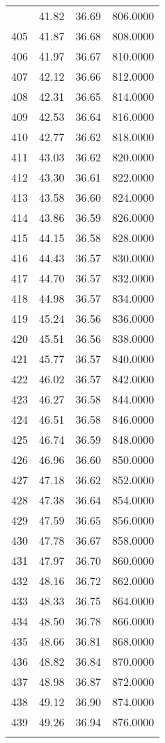 \documentclass[
  captions=tableheading,
]{scrartcl}
\begin{document}
\begin{longtable} {l|l|l|l}
{404	& 41.82 &	36.69 &	806.0000\\
405	& 41.87 &	36.68 &	808.0000\\
406	& 41.97 &	36.67 &	810.0000\\
407	& 42.12 &	36.66 &	812.0000\\
408	& 42.31 &	36.65 &	814.0000\\
409	& 42.53 &	36.64 &	816.0000\\
410	& 42.77 &	36.62 &	818.0000\\
411	& 43.03 &	36.62 &	820.0000\\
412	& 43.30 &	36.61 &	822.0000\\
413	& 43.58 &	36.60 &	824.0000\\
414	& 43.86 &	36.59 &	826.0000\\
415	& 44.15 &	36.58 &	828.0000\\
416	& 44.43 &	36.57 &	830.0000\\
417	& 44.70 &	36.57 &	832.0000\\
418	& 44.98 &	36.57 &	834.0000\\
419	& 45.24 &	36.56 &	836.0000\\
420	& 45.51 &	36.56 &	838.0000\\
421	& 45.77 &	36.57 &	840.0000\\
422	& 46.02 &	36.57 &	842.0000\\
423	& 46.27 &	36.58 &	844.0000\\
424	& 46.51 &	36.58 &	846.0000\\
425	& 46.74 &	36.59 &	848.0000\\
426	& 46.96 &	36.60 &	850.0000\\
427	& 47.18 &	36.62 &	852.0000\\
428	& 47.38 &	36.64 &	854.0000\\
429	& 47.59 &	36.65 &	856.0000\\
430	& 47.78 &	36.67 &	858.0000\\
431	& 47.97 &	36.70 &	860.0000\\
432	& 48.16 &	36.72 &	862.0000\\
433	& 48.33 &	36.75 &	864.0000\\
434	& 48.50 &	36.78 &	866.0000\\
435	& 48.66 &	36.81 &	868.0000\\
436	& 48.82 &	36.84 &	870.0000\\
437	& 48.98 &	36.87 &	872.0000\\
438	& 49.12 &	36.90 &	874.0000\\
439	& 49.26 &	36.94 &	876.0000\\
}
\end{longtable}
\end{document}
